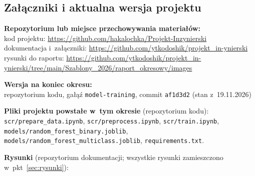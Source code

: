 \documentclass[11pt,a4paper,oneside]{article}
\newif\ifpodpowiedzi
\newcommand{\podpowiedz}[1]{\ifpodpowiedzi\par\begingroup\small\color{hintcolor}\textit{Wskazówka: #1}\par\endgroup\fi}
\newcommand{\repokod}{https://github.com/hakalochka/Projekt-Inzynierski}
\newcommand{\repodok}{https://github.com/ytkodoshik/projekt_in-ynierski}
\newcommand{\zalaczniki}{https://github.com/ytkodoshik/projekt_in-ynierski/tree/main/Szablony_2026/raport_okresowy/images}
\begin{document}
\subsection{Załączniki i aktualna wersja projektu}\label{sec:zalaczniki}

\podpowiedz{Podaj adres repozytorium lub uzgodnionego z prowadzącymi miejsca przechowywania materiałów. W polu „Wersja na koniec okresu” wskaż stan projektu opisany w raporcie: identyfikator commitu, tag albo nazwę i datę wersji plików, np. animacja-v03-2026-10-25. Nie chodzi tu o wersję dokumentu raportu. W tabeli wymień materiały potwierdzające wykonane prace, np. wyniki testów, zrzuty ekranu, pliki projektu lub próbne rendery. W kolumnie „Oznaczenie” nadaj im kolejne symbole Z1, Z2 itd.; w kolumnie „Plik / odnośnik” podaj nazwę pliku lub adres umożliwiający dostęp; w kolumnie „Opis i powiązane zadanie” wyjaśnij, co materiał przedstawia i którego zadania dotyczy, np. „Wyniki testów logowania opisanych w pkt 1.3.1”. Do oznaczeń załączników odwołuj się w opisach wykonanych prac. Dodaj lub usuń wiersze według potrzeb. Sam odnośnik do materiałów nie zastępuje opisu prac w raporcie.}

\textbf{Repozytorium lub miejsce przechowywania materiałów:}\\
kod projektu: \url{\repokod}\\
dokumentacja i~załączniki: \url{\repodok}\\
rysunki do raportu: \url{\zalaczniki}\par

\textbf{Wersja na koniec okresu:}\\
repozytorium kodu, gałąź \texttt{model-training}, commit \texttt{af1d3d2} (stan z~19.11.2026)\par

\textbf{Pliki projektu powstałe w~tym okresie} (repozytorium kodu): \nolinkurl{scr/prepare_data.ipynb}, \nolinkurl{scr/preprocess.ipynb}, \nolinkurl{scr/train.ipynb}, \nolinkurl{models/random_forest_binary.joblib}, \nolinkurl{models/random_forest_multiclass.joblib}, \nolinkurl{requirements.txt}.\par

\textbf{Rysunki} (repozytorium dokumentacji; wszystkie rysunki zamieszczono w~pkt~\ref{sec:rysunki}):
\end{document}
